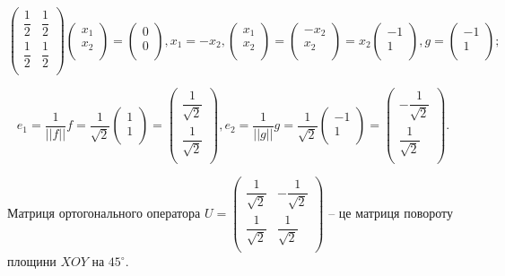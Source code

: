 $$\begin{pmatrix}
	\dfrac{1}{2} & \dfrac{1}{2} \\
	\dfrac{1}{2} & \dfrac{1}{2} \\
\end{pmatrix} \begin{pmatrix}
	x_1 \\
	x_2 \\
\end{pmatrix} = \begin{pmatrix}
	0 \\
	0 \\
\end{pmatrix}, x_1 = -x_2, \begin{pmatrix}
	x_1 \\
	x_2 \\
\end{pmatrix} = \begin{pmatrix}
	-x_2 \\
	x_2 \\
\end{pmatrix} = x_2 \begin{pmatrix}
	-1 \\
	1 \\
\end{pmatrix}, g = \begin{pmatrix}
	-1 \\
	1 \\
\end{pmatrix};$$

$$e_1 = \dfrac{1}{||f||}f = \dfrac{1}{\sqrt{2}} \begin{pmatrix}
	1 \\
	1 \\
\end{pmatrix} = \begin{pmatrix}
	\dfrac{1}{\sqrt{2}} \\
	\dfrac{1}{\sqrt{2}} \\
\end{pmatrix}, e_2 = \dfrac{1}{||g||}g = \dfrac{1}{\sqrt{2}} \begin{pmatrix}
	-1 \\
	1 \\
\end{pmatrix} = \begin{pmatrix}
	-\dfrac{1}{\sqrt{2}} \\
	\dfrac{1}{\sqrt{2}} \\
\end{pmatrix}.$$

Матриця ортогонального оператора $U = \begin{pmatrix}
	\dfrac{1}{\sqrt{2}} & -\dfrac{1}{\sqrt{2}} \\
	\dfrac{1}{\sqrt{2}} & \dfrac{1}{\sqrt{2}} \\
\end{pmatrix}$ -- це матриця повороту
площини $XOY$ на $45^{\circ}$.

